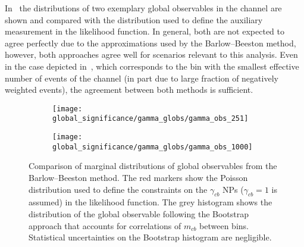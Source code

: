In~ the distributions of two exemplary
global observables in the \hadhad channel are shown and compared with the
distribution used to define the auxiliary measurement in the likelihood
function. In general, both are not expected to agree perfectly due to the
approximations used by the Barlow--Beeston method, however, both approaches agree
well for scenarios relevant to this analysis. Even in the case depicted
in~, which corresponds to the
bin with the smallest effective number of events of the \hadhad channel (in part
due to large fraction of negatively weighted events), the agreement between both
methods is sufficient.

\begin{figure}[htbp]
  \centering

  \begin{subfigure}{0.485\textwidth}
    \centering

    \texttt{[image: global\_significance/gamma\_globs/gamma\_obs\_251]}
    \label{fig:comparison_bootstrap_poisson_lowest_tau}
  \end{subfigure}\hfill%
  \begin{subfigure}{0.485\textwidth}
    \centering

    \texttt{[image: global\_significance/gamma\_globs/gamma\_obs\_1000]}
  \end{subfigure}

  \caption{Comparison of marginal distributions of global observables from the
    Barlow--Beeston method. The red markers show the Poisson distribution used to
    define the constraints on the $\gamma_{cb}$ NPs ($\gamma_{cb} = 1$ is
    assumed) in the likelihood function. The grey histogram shows the
    distribution of the global observable following the Bootstrap approach that
    accounts for correlations of $m_{cb}$ between bins. Statistical
    uncertainties on the Bootstrap histogram are negligible.}
  \label{fig:comparison_bootstrap_poisson}
\end{figure}



